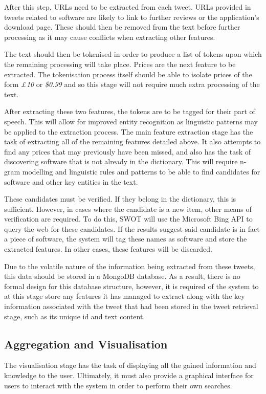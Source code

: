 After this step, URLs need to be extracted from each tweet. URLs provided in tweets related to software are likely to link to further reviews or the application's download page. These should then be removed from the text before further processing as it may cause conflicts when extracting other features.

The text should then be tokenised in order to produce a list of tokens upon which the remaining processing will take place. Prices are the next feature to be extracted. The tokenisation process itself should be able to isolate prices of the form \emph{£10} or \emph{\$0.99} and so this stage will not require much extra processing of the text.

After extracting these two features, the tokens are to be tagged for their part of speech. This will allow for improved entity recognition as linguistic patterns may be applied to the extraction process. The main feature extraction stage has the task of extracting all of the remaining features detailed above. It also attempts to find any prices that may previously have been missed, and also has the task of discovering software that is not already in the dictionary. This will require n-gram modelling and linguistic rules and patterns to be able to find candidates for software and other key entities in the text.

These candidates must be verified. If they belong in the dictionary, this is sufficient. However, in cases where the candidate is a new item, other means of verification are required. To do this, SWOT will use the Microsoft Bing API to query the web for these candidates. If the results suggest said candidate is in fact a piece of software, the system will tag these names as software and store the extracted features. In other cases, these features will be discarded.

Due to the volatile nature of the information being extracted from these tweets, this data should be stored in a MongoDB database. As a result, there is no formal design for this database structure, however, it is required of the system to at this stage store any features it has managed to extract along with the key information associated with the tweet that had been stored in the tweet retrieval stage, such as its unique id and text content.

\subsection{Aggregation and Visualisation}
\label{sec:arc3}
The visualisation stage has the task of displaying all the gained information and knowledge to the user. Ultimately, it must also provide a graphical interface for users to interact with the system in order to perform their own searches.

